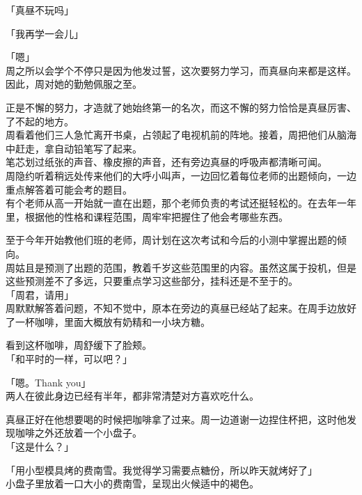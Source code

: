 「真昼不玩吗」

「我再学一会儿」

「嗯」\\

周之所以会学个不停只是因为他发过誓，这次要努力学习，而真昼向来都是这样。因此，周对她的勤勉佩服之至。

正是不懈的努力，才造就了她始终第一的名次，而这不懈的努力恰恰是真昼厉害、了不起的地方。\\

周看着他们三人急忙离开书桌，占领起了电视机前的阵地。接着，周把他们从脑海中赶走，拿自动铅笔写了起来。\\

笔芯划过纸张的声音、橡皮擦的声音，还有旁边真昼的呼吸声都清晰可闻。\\

周隐约听着稍远处传来他们的大呼小叫声，一边回忆着每位老师的出题倾向，一边重点解答着可能会考的题目。\\

有个老师从高一开始就一直在出题，那个老师负责的考试还挺轻松的。在去年一年里，根据他的性格和课程范围，周牢牢把握住了他会考哪些东西。

至于今年开始教他们班的老师，周计划在这次考试和今后的小测中掌握出题的倾向。\\

周姑且是预测了出题的范围，教着千岁这些范围里的内容。虽然这属于投机，但是这些预测差不了多远，只要重点学习这些部分，挂科还是不至于的。\\

「周君，请用」\\

周默默解答着问题，不知不觉中，原本在旁边的真昼已经站了起来。在周手边放好了一杯咖啡，里面大概放有奶精和一小块方糖。

看到这杯咖啡，周舒缓下了脸颊。\\

「和平时的一样，可以吧？」

「嗯。Thank you」\\

两人在彼此身边已经有半年，都非常清楚对方喜欢吃什么。

真昼正好在他想要喝的时候把咖啡拿了过来。周一边道谢一边捏住杯把，这时他发现咖啡之外还放着一个小盘子。\\

「这是什么？」

「用小型模具烤的费南雪。我觉得学习需要点糖份，所以昨天就烤好了」\\

小盘子里放着一口大小的费南雪，呈现出火候适中的褐色。\\

